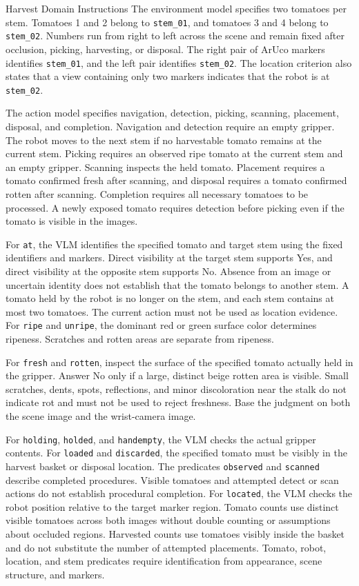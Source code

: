 \begin{vlmpromptbox}{Harvest Domain Instructions}
The environment model specifies two tomatoes per stem. Tomatoes 1 and 2 belong to \texttt{stem\_01}, and tomatoes 3 and 4 belong to \texttt{stem\_02}. Numbers run from right to left across the scene and remain fixed after occlusion, picking, harvesting, or disposal. The right pair of ArUco markers identifies \texttt{stem\_01}, and the left pair identifies \texttt{stem\_02}. The location criterion also states that a view containing only two markers indicates that the robot is at \texttt{stem\_02}.

The action model specifies navigation, detection, picking, scanning, placement, disposal, and completion. Navigation and detection require an empty gripper. The robot moves to the next stem if no harvestable tomato remains at the current stem. Picking requires an observed ripe tomato at the current stem and an empty gripper. Scanning inspects the held tomato. Placement requires a tomato confirmed fresh after scanning, and disposal requires a tomato confirmed rotten after scanning. Completion requires all necessary tomatoes to be processed. A newly exposed tomato requires detection before picking even if the tomato is visible in the images.

For \texttt{at}, the VLM identifies the specified tomato and target stem using the fixed identifiers and markers. Direct visibility at the target stem supports Yes, and direct visibility at the opposite stem supports No. Absence from an image or uncertain identity does not establish that the tomato belongs to another stem. A tomato held by the robot is no longer on the stem, and each stem contains at most two tomatoes. The current action must not be used as location evidence. For \texttt{ripe} and \texttt{unripe}, the dominant red or green surface color determines ripeness. Scratches and rotten areas are separate from ripeness.

For \texttt{fresh} and \texttt{rotten}, inspect the surface of the specified tomato actually held in the gripper. Answer No only if a large, distinct beige rotten area is visible. Small scratches, dents, spots, reflections, and minor discoloration near the stalk do not indicate rot and must not be used to reject freshness. Base the judgment on both the scene image and the wrist-camera image.

For \texttt{holding}, \texttt{holded}, and \texttt{handempty}, the VLM checks the actual gripper contents. For \texttt{loaded} and \texttt{discarded}, the specified tomato must be visibly in the harvest basket or disposal location. The predicates \texttt{observed} and \texttt{scanned} describe completed procedures. Visible tomatoes and attempted detect or scan actions do not establish procedural completion. For \texttt{located}, the VLM checks the robot position relative to the target marker region. Tomato counts use distinct visible tomatoes across both images without double counting or assumptions about occluded regions. Harvested counts use tomatoes visibly inside the basket and do not substitute the number of attempted placements. Tomato, robot, location, and stem predicates require identification from appearance, scene structure, and markers.


\end{vlmpromptbox}
